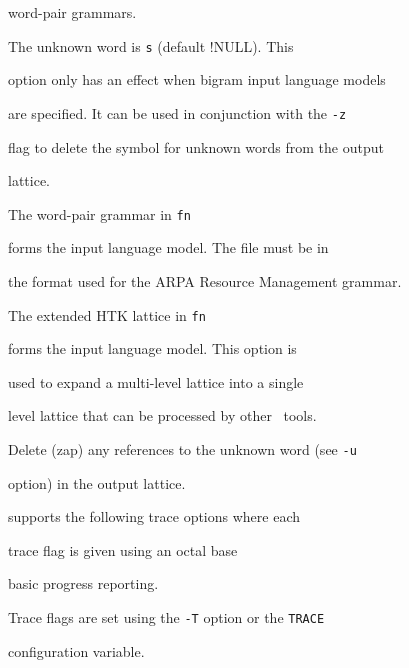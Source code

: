 \begin{optlist}
          word-pair grammars.





   The unknown word is {\tt s} (default !NULL). This


         option only has an effect when bigram input language models 


         are specified. It can be used in conjunction with the {\tt -z}


         flag to delete the symbol for unknown words from the output


         lattice.





   The word-pair grammar in {\tt fn} 


              forms the input language model. The file must be in


         the format used for the ARPA Resource Management grammar.





   The extended HTK lattice in {\tt fn} 


              forms the input language model. This option is


              used to expand a multi-level lattice into a single


              level lattice that can be processed by other \HTK\ tools.





   Delete (zap) any references to the unknown word (see {\tt -u} 


              option) in the output lattice.





\end{optlist}












 supports the following trace options where each


trace flag is given using an octal base


\begin{optlist}


    basic progress reporting.


\end{optlist}


Trace flags are set using the \texttt{-T} option or the  \texttt{TRACE} 


configuration variable.


















